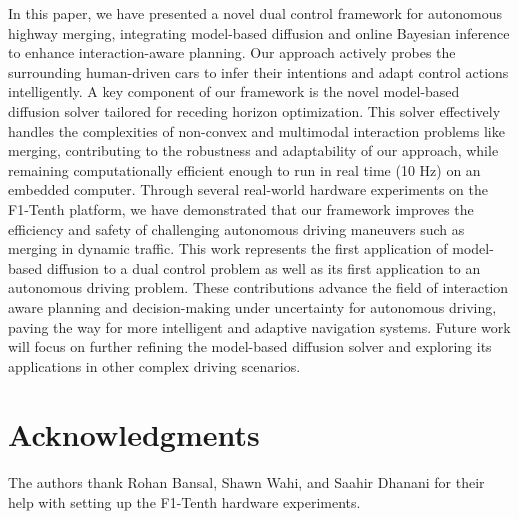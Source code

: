\documentclass[letterpaper, 10 pt, conference]{IEEEconf}
\begin{document}
In this paper, we have presented a novel dual control framework for autonomous highway merging, integrating model-based diffusion and online Bayesian inference to enhance interaction-aware planning. 
Our approach actively probes the surrounding human-driven cars to infer their intentions and adapt control actions intelligently. 
A key component of our framework is the novel model-based diffusion solver tailored for receding horizon optimization. 
This solver effectively handles the complexities of non-convex and multimodal interaction problems like merging, contributing to the robustness and adaptability of our approach, while remaining computationally efficient enough to run in real time (10 Hz) on an embedded computer. 
Through several real-world hardware experiments on the F1-Tenth platform, we have demonstrated that our framework improves the efficiency and safety of challenging autonomous driving maneuvers such as merging in dynamic traffic.
This work represents the first application of model-based diffusion to a dual control problem as well as its first application to an autonomous driving problem. 
These contributions advance the field of interaction aware planning and decision-making under uncertainty for autonomous driving, paving the way for more intelligent and adaptive navigation systems. 
Future work will focus on further refining the model-based diffusion solver and exploring its applications in other complex driving scenarios.

\section{Acknowledgments}

The authors thank Rohan Bansal, Shawn Wahi, and Saahir Dhanani for their help with setting up the F1-Tenth hardware experiments. 



\end{document}
